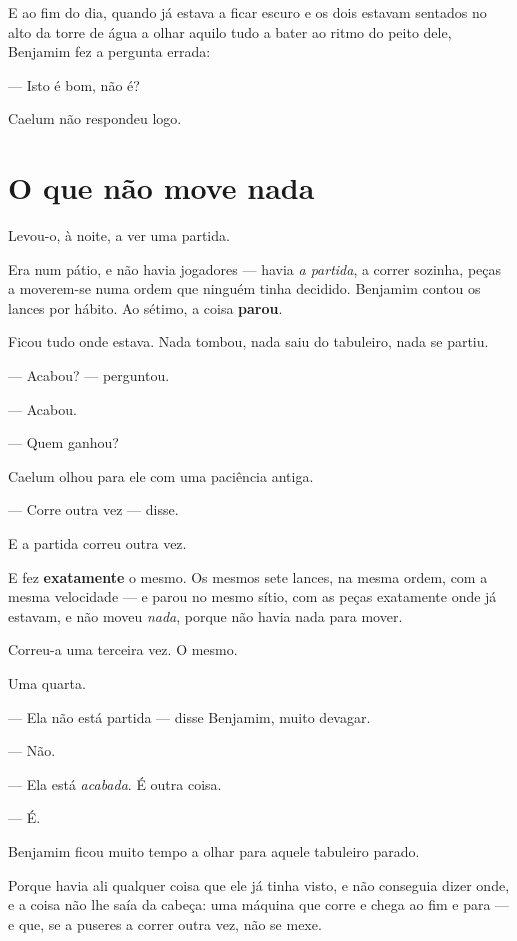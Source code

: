 \documentclass[livro.tex]{subfiles}
\begin{document}
\medskip

E ao fim do dia, quando já estava a ficar escuro e os dois estavam sentados no alto da torre de água a olhar
aquilo tudo a bater ao ritmo do peito dele, Benjamim fez a pergunta errada:

--- Isto é bom, não é?

Caelum não respondeu logo.

\section*{O que não move nada}

Levou-o, à noite, a ver uma partida.

Era num pátio, e não havia jogadores --- havia \emph{a partida}, a correr sozinha, peças a moverem-se numa ordem
que ninguém tinha decidido. Benjamim contou os lances por hábito. Ao sétimo, a coisa \textbf{parou}.

Ficou tudo onde estava. Nada tombou, nada saiu do tabuleiro, nada se partiu.

--- Acabou? --- perguntou.

--- Acabou.

--- Quem ganhou?

Caelum olhou para ele com uma paciência antiga.

--- Corre outra vez --- disse.

\medskip

E a partida correu outra vez.

E fez \textbf{exatamente} o mesmo. Os mesmos sete lances, na mesma ordem, com a mesma velocidade --- e parou no
mesmo sítio, com as peças exatamente onde já estavam, e não moveu \emph{nada}, porque não havia nada para mover.

Correu-a uma terceira vez. O mesmo.

Uma quarta.

\medskip

--- Ela não está partida --- disse Benjamim, muito devagar.

--- Não.

--- Ela está \emph{acabada}. É outra coisa.

--- É.

\medskip

Benjamim ficou muito tempo a olhar para aquele tabuleiro parado.

Porque havia ali qualquer coisa que ele já tinha visto, e não conseguia dizer onde, e a coisa não lhe saía da
cabeça: uma máquina que corre e chega ao fim e para --- e que, se a puseres a correr outra vez, não se mexe.
\end{document}
